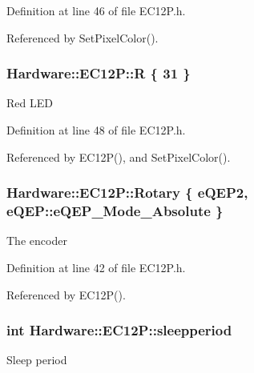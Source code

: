 Definition at line 46 of file E\+C12\+P.\+h.



Referenced by Set\+Pixel\+Color().

\hypertarget{class_hardware_1_1_e_c12_p_a0a4f03a37d709349994e800e44f5c781}{}
\subsubsection[{R}]{ Hardware\+::\+E\+C12\+P\+::\+R \{ 31 \}\hspace{0.3cm}{\ttfamily [private]}}\label{class_hardware_1_1_e_c12_p_a0a4f03a37d709349994e800e44f5c781}
Red L\+E\+D 

Definition at line 48 of file E\+C12\+P.\+h.



Referenced by E\+C12\+P(), and Set\+Pixel\+Color().

\hypertarget{class_hardware_1_1_e_c12_p_abfe8d6ea8948c77d4866ca8a05dbebe9}{}
\subsubsection[{Rotary}]{ Hardware\+::\+E\+C12\+P\+::\+Rotary \{ {\bf e\+Q\+E\+P2}, {\bf e\+Q\+E\+P\+::e\+Q\+E\+P\+\_\+\+Mode\+\_\+\+Absolute} \}}\label{class_hardware_1_1_e_c12_p_abfe8d6ea8948c77d4866ca8a05dbebe9}
The encoder 

Definition at line 42 of file E\+C12\+P.\+h.



Referenced by E\+C12\+P().

\hypertarget{class_hardware_1_1_e_c12_p_adff7ed51fd97bac61075c88a06102348}{}
\subsubsection[{sleepperiod}]{\setlength{\rightskip}{0pt plus 5cm}int Hardware\+::\+E\+C12\+P\+::sleepperiod\hspace{0.3cm}{\ttfamily [private]}}\label{class_hardware_1_1_e_c12_p_adff7ed51fd97bac61075c88a06102348}
Sleep period 

